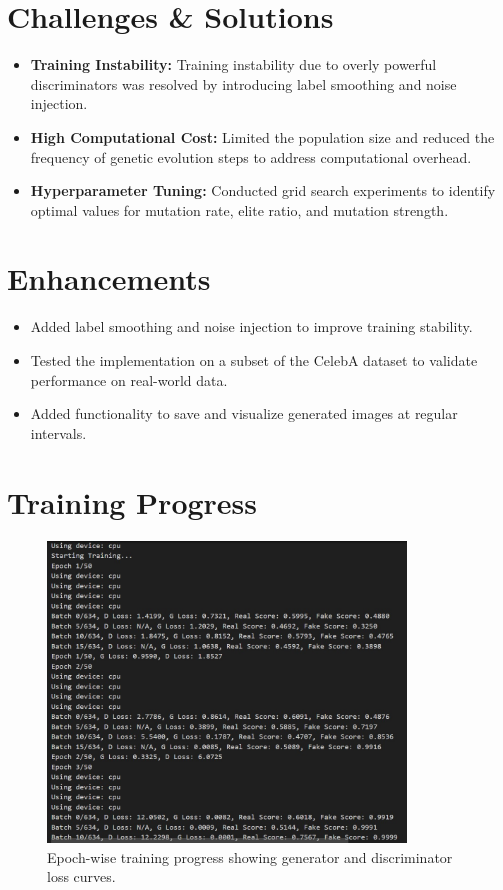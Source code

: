 \documentclass[12pt]{article}
\begin{document}
\section*{Challenges \& Solutions}
\begin{itemize}
    \item \textbf{Training Instability:} Training instability due to overly powerful discriminators was resolved by introducing label smoothing and noise injection.
    \item \textbf{High Computational Cost:} Limited the population size and reduced the frequency of genetic evolution steps to address computational overhead.
    \item \textbf{Hyperparameter Tuning:} Conducted grid search experiments to identify optimal values for mutation rate, elite ratio, and mutation strength.
\end{itemize}

\section*{Enhancements}
\begin{itemize}
    \item Added label smoothing and noise injection to improve training stability.
    \item Tested the implementation on a subset of the CelebA dataset to validate performance on real-world data.
    \item Added functionality to save and visualize generated images at regular intervals.
\end{itemize}

\section*{Training Progress}

\begin{figure}[h!]
    \centering
    \includegraphics[width=0.85\textwidth]{tracking_progress.jpg}
    \caption{Epoch-wise training progress showing generator and discriminator loss curves.}
    \label{fig:training-progress}
\end{figure}
\end{document}
